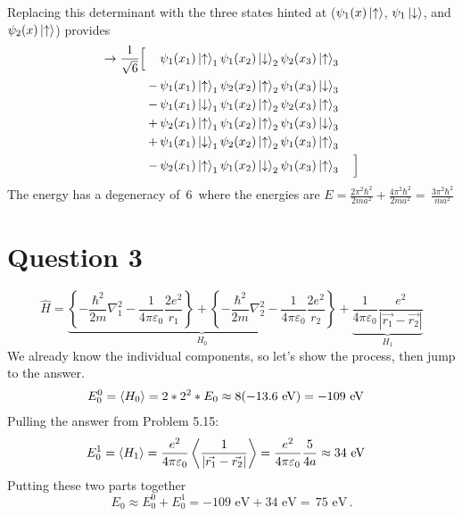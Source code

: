 \documentclass[11pt]{article}
\begin{document}
\begin{enumerate}[label=\alph*)]
Replacing this determinant with the three states hinted at ($\psi_1(x)\ket{\uparrow}$, $\psi_1\ket{\downarrow}$, and $\psi_2(x)\ket{\uparrow}$) provides 
\begin{align*}
\rightarrow \frac{1}{\sqrt{6}} \Big[ \quad \, &  \psi_1(x_1)\ket{\uparrow}_1\psi_1(x_2)\ket{\downarrow}_2\psi_2(x_3)\ket{\uparrow}_3\\
-\,&\psi_1(x_1)\ket{\uparrow}_1\psi_2(x_2)\ket{\uparrow}_2\psi_1(x_3)\ket{\downarrow}_3\\
-\,&\psi_1(x_1)\ket{\downarrow}_1\psi_1(x_2)\ket{\uparrow}_2\psi_2(x_3)\ket{\uparrow}_3\\
+\,&\psi_2(x_1)\ket{\uparrow}_1\psi_1(x_2)\ket{\uparrow}_2\psi_1(x_3)\ket{\downarrow}_3\\
+\,&\psi_1(x_1)\ket{\downarrow}_1\psi_2(x_2)\ket{\uparrow}_2\psi_1(x_3)\ket{\uparrow}_3\\
-\,&\psi_2(x_1)\ket{\uparrow}_1\psi_1(x_2)\ket{\downarrow}_2\psi_1(x_3)\ket{\uparrow}_3 \quad \Big]
\end{align*}
The energy has a degeneracy of $\boxed{\, 6 \, }$ where the energies are $\displaystyle{E = \frac{2\pi^2 \hbar^2}{2ma^2} + \frac{4\pi^2\hbar^2}{2ma^2} = \boxed{\,\frac{3\pi^2\hbar^2}{ma^2} \, }}$
\end{enumerate}

\newpage



\section*{Question 3}

\[\hat{H} = \underbrace{\left\{-\frac{\hbar^2}{2m}\nabla_1^2 - \frac{1}{4\pi\varepsilon_0}\frac{2e^2}{r_1}\right\} + \left\{-\frac{\hbar^2}{2m}\nabla_2^2 - \frac{1}{4\pi\varepsilon_0}\frac{2e^2}{r_2}\right\}}_{H_0} + \underbrace{\frac{1}{4\pi\varepsilon_0}\frac{e^2}{\left|\vec{r_1} - \vec{r_2}\right|}}_{H_1}\]
We already know the individual components, so let's show the process, then jump to the answer.
\begin{align*}
E_0^0 = \ev{H_0} & = 2 * 2^2 * E_0 \approx 8 (-13.6\text{ eV}) = -109 \text{ eV}
\end{align*}
Pulling the answer from Problem 5.15:
\begin{align*}
E_0^1 = \ev{H_1} & = \frac{e^2}{4\pi\varepsilon_0}\ev{\frac{1}{\left|\vec{r_1} - \vec{r_2}\right|}} = \frac{e^2}{4\pi\varepsilon_0} \frac{5}{4a} \approx 34 \text{ eV}
\end{align*}
Putting these two parts together
\[E_0 \approx E_0^0 + E_0^1 = -109\text{ eV} + 34 \text{ eV} = \boxed{\, 75 \text{ eV}\,}.\]
\end{document}
